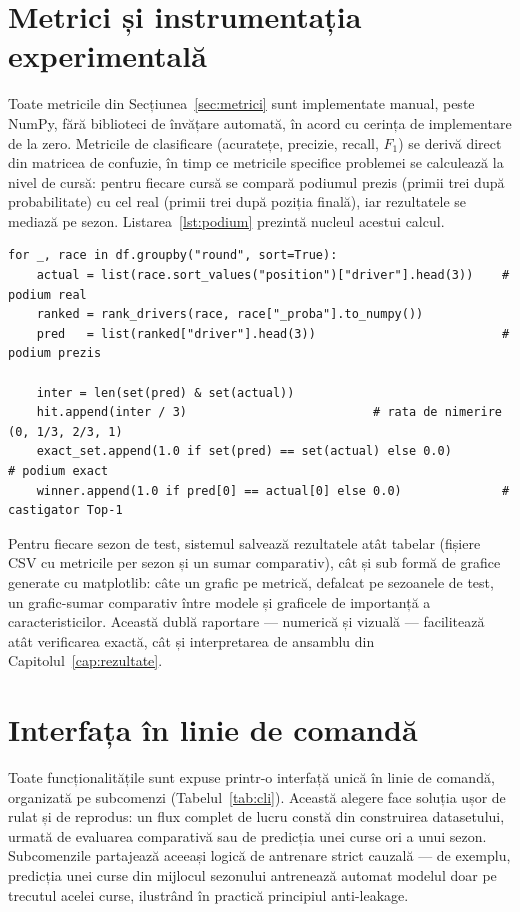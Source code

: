 \documentclass[12pt,a4paper]{report}
\begin{document}
\section{Metrici și instrumentația experimentală}
\label{sec:instrumentatie}

Toate metricile din Secțiunea~\ref{sec:metrici} sunt implementate manual, peste NumPy, fără
biblioteci de învățare automată, în acord cu cerința de implementare de la zero. Metricile de
clasificare (acuratețe, precizie, recall, $F_1$) se derivă direct din matricea de confuzie, în timp
ce metricile specifice problemei se calculează la nivel de cursă: pentru fiecare cursă se compară
podiumul prezis (primii trei după probabilitate) cu cel real (primii trei după poziția finală), iar
rezultatele se mediază pe sezon. Listarea~\ref{lst:podium} prezintă nucleul acestui calcul.

\begin{lstlisting}[caption={Calculul metricilor de podium per cursa, apoi mediate pe sezon.}, label={lst:podium}]
for _, race in df.groupby("round", sort=True):
    actual = list(race.sort_values("position")["driver"].head(3))    # podium real
    ranked = rank_drivers(race, race["_proba"].to_numpy())
    pred   = list(ranked["driver"].head(3))                          # podium prezis

    inter = len(set(pred) & set(actual))
    hit.append(inter / 3)                          # rata de nimerire (0, 1/3, 2/3, 1)
    exact_set.append(1.0 if set(pred) == set(actual) else 0.0)        # podium exact
    winner.append(1.0 if pred[0] == actual[0] else 0.0)              # castigator Top-1
\end{lstlisting}

Pentru fiecare sezon de test, sistemul salvează rezultatele atât tabelar (fișiere CSV cu metricile
per sezon și un sumar comparativ), cât și sub formă de grafice generate cu matplotlib: câte un
grafic pe metrică, defalcat pe sezoanele de test, un grafic-sumar comparativ între modele și
graficele de importanță a caracteristicilor. Această dublă raportare --- numerică și vizuală ---
facilitează atât verificarea exactă, cât și interpretarea de ansamblu din Capitolul~\ref{cap:rezultate}.

\section{Interfața în linie de comandă}
\label{sec:cli}

Toate funcționalitățile sunt expuse printr-o interfață unică în linie de comandă, organizată pe
subcomenzi (Tabelul~\ref{tab:cli}). Această alegere face soluția ușor de rulat și de reprodus: un
flux complet de lucru constă din construirea datasetului, urmată de evaluarea comparativă sau de
predicția unei curse ori a unui sezon. Subcomenzile partajează aceeași logică de antrenare strict
cauzală --- de exemplu, predicția unei curse din mijlocul sezonului antrenează automat modelul doar
pe trecutul acelei curse, ilustrând în practică principiul anti-leakage.
\end{document}
